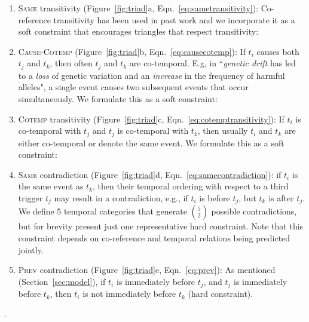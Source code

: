 \begin{enumerate}[itemsep=0pt,topsep=0pt] 
\item \textsc{Same} transitivity (Figure~\ref{fig:triad}a, Eqn.~\ref{eq:sametransitivity}): Co-reference transitivity has been used in past work \cite{Finkel08} and we incorporate it as a soft constraint that encourages triangles that respect transitivity: 


\item \textsc{Cause}-\textsc{Cotemp} (Figure~\ref{fig:triad}b, Eqn.~\ref{eq:causecotemp}): If $t_i$ causes both $t_j$ and $t_k$, then often $t_j$ and $t_k$ are co-temporal. E.g, in ``\emph{genetic drift} has led to a \emph{loss} of genetic variation and an \emph{increase} in the frequency of harmful alleles", a single event causes two subsequent events that occur simultaneously. We formulate this as a soft constraint:

\item \textsc{Cotemp} transitivity (Figure~\ref{fig:triad}c, Eqn.~\ref{eq:cotemptransitivity}):  If $t_i$ is co-temporal with $t_j$ and $t_j$ is co-temporal with $t_k$, then usually $t_i$ and $t_k$ are either co-temporal or denote the same event. We formulate this as a soft constraint:

\item \textsc{Same} contradiction (Figure~\ref{fig:triad}d, Eqn.~\ref{eq:samecontradiction}): if $t_i$ is the same event as  $t_k$, then their temporal ordering with respect to a third trigger $t_j$ may result in a contradiction, e.g., if $t_i$ is before $t_j$, but $t_k$ is after $t_j$. We define 5 temporal categories that generate $5 \choose 2$ possible contradictions, but for brevity present just one representative hard constraint. Note that this constraint depends on co-reference and temporal relations being predicted jointly.
\item \textsc{Prev} contradiction (Figure~\ref{fig:triad}e, Eqn.~\ref{eq:prev}): As mentioned (Section~\ref{sec:model}), if $t_i$ is immediately before $t_j$, and $t_j$ is immediately before $t_k$, then $t_i$ is not immediately before $t_k$ (hard constraint).
\end{enumerate}.

